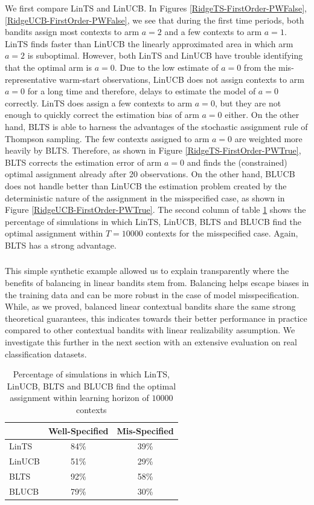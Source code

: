 \documentclass[letterpaper]{article} %
\begin{document}
We first compare LinTS and LinUCB.
In Figures \ref{RidgeTS-FirstOrder-PWFalse}, \ref{RidgeUCB-FirstOrder-PWFalse}, we see that during the first time periods, both bandits assign most contexts to arm $a = 2$ and a few contexts to arm $a = 1$.
LinTS finds faster than LinUCB the linearly approximated area in which arm $a = 2$ is suboptimal.
However, both LinTS and LinUCB have trouble identifying that the optimal arm is $a = 0$.
Due to the low estimate of $a = 0$ from the mis-representative warm-start observations, LinUCB does not assign contexts to arm $a = 0$ for a long time and therefore, delays to estimate the model of $a = 0$ correctly.
LinTS does assign a few contexts to arm $a = 0$, but they are not enough to quickly correct the estimation bias of arm $a = 0$ either.
On the other hand, BLTS is able to harness the advantages of the stochastic assignment rule of Thompson sampling.
The few contexts assigned to arm $a = 0$ are weighted more heavily by BLTS.
Therefore, as shown in Figure \ref{RidgeTS-FirstOrder-PWTrue}, BLTS corrects the estimation error of arm $a = 0$ and finds the (constrained) optimal assignment already after 20 observations.
On the other hand, BLUCB does not handle better than LinUCB the estimation problem created by the deterministic nature of the assignment in the misspecified case, as shown in Figure \ref{RidgeUCB-FirstOrder-PWTrue}.
The second column of table \ref{RidgeTSUCB-Percentages} shows the percentage of simulations in which LinTS, LinUCB, BLTS and BLUCB find the optimal assignment within $T = 10000$ contexts for the misspecified case.
Again, BLTS has a strong advantage.


\subsubsection{}
This simple synthetic example allowed us to explain transparently where the benefits of balancing in linear bandits stem from. Balancing helps escape biases in the training data and can be more robust in the case of model misspecification.
While, as we proved, balanced linear contextual bandits share the same strong theoretical guarantees, this indicates towards their better performance in practice compared to other contextual bandits with linear realizability assumption.
We investigate this further in the next section with an extensive evaluation on real classification datasets.


\begin{table}[h]
\centering
\begin{tabular}{l||c||c}
& Well-Specified & Mis-Specified \\
\hline
LinTS & 84\% & 39\% \\
\hline
LinUCB & 51\% & 29\%  \\
\hline
{BLTS} & {92\%} & {58\%}  \\
\hline
BLUCB & 79\% & 30\% \\
\hline
\end{tabular}
\caption{Percentage of simulations in which LinTS, LinUCB, BLTS and BLUCB find the optimal assignment within learning horizon of $10000$ contexts}
\label{RidgeTSUCB-Percentages}
\end{table}
\end{document}

